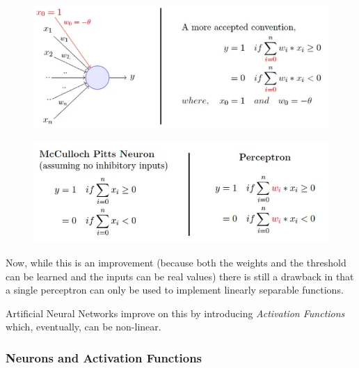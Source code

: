 \documentclass[
  letterpaper,
  DIV=11,
  numbers=noendperiod,
  oneside]{scrartcl}
\begin{document}
\begin{figure}

{\centering 

\href{https://towardsdatascience.com/perceptron-the-artificial-neuron-4d8c70d5cc8d}{\includegraphics{images/RosenblattPerceptron2.png}}

}

\end{figure}

\begin{figure}

{\centering 

\href{https://towardsdatascience.com/perceptron-the-artificial-neuron-4d8c70d5cc8d}{\includegraphics{images/McCullaughVSRosenblattPerceptron.png}}

}

\end{figure}

Now, while this is an improvement (because both the weights and the
threshold can be learned and the inputs can be real values) there is
still a drawback in that a single perceptron can only be used to
implement linearly separable functions.

Artificial Neural Networks improve on this by introducing
\emph{Activation Functions} which, eventually, can be non-linear.

\hypertarget{neurons-and-activation-functions}{%
\subsubsection{Neurons and Activation
Functions}\label{neurons-and-activation-functions}}
\end{document}
